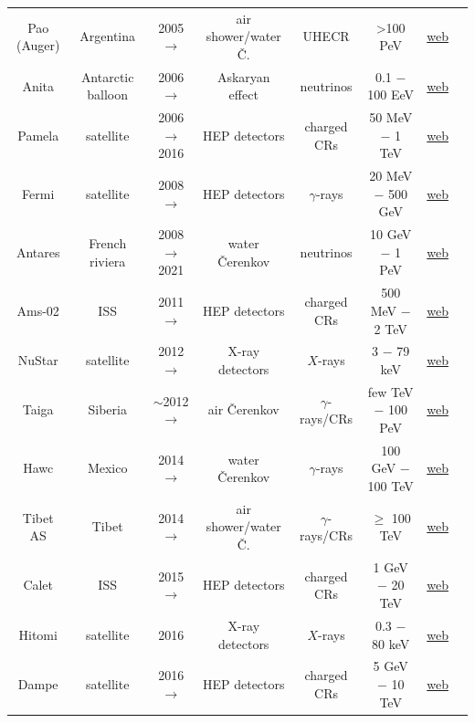 \begin{table}[p]
\begin{center}
{\begin{tabular}{cccccccc}
{\sc  Pao (Auger)} & Argentina & 2005 $\to$ & air shower/water \v C. &  UHECR & >100 PeV  & \href{https://www.auger.org/}{web} &\cite{Auger} \\
{\sc Anita} & Antarctic balloon & 2006 $\to$ & Askaryan effect & neutrinos & 0.1 $-$ 100 EeV &  \href{https://www.phys.hawaii.edu/~anita/}{web} & \cite{Anita} \\
{\sc Pamela} & satellite & 2006 $\to$ 2016 & HEP detectors & charged CRs & 50 MeV $-$ 1 TeV & \href{http://pamela.roma2.infn.it/index.php}{web}  & \cite{Pamela} \\
{\sc  Fermi} & satellite & 2008 $\to$ & HEP detectors  & $\gamma$-rays & 20 MeV $-$ 500 GeV & \href{http://fermi.gsfc.nasa.gov}{web} & \cite{Fermi} \\
{\sc  Antares} & French riviera & 2008 $\to$ 2021 & water \v Cerenkov & neutrinos & 10 GeV $-$ 1 PeV & \href{http://antares.in2p3.fr}{web}  & \cite{Antares} \\
{\sc Ams-02} & ISS & 2011 $\to$ & HEP detectors  & charged CRs & 500 MeV $-$ 2 TeV & \href{http://www.ams02.space}{web}  & \cite{Ams-02} \\
{\sc NuStar} & satellite & 2012 $\to$ & X-ray detectors  & $X$-rays & 3 $-$ 79 keV & \href{http://www.nustar.caltech.edu/page/researchers}{web}  & \cite{NuStar} \\
{\sc Taiga} & Siberia & $\sim$2012 $\to$ & air \v Cerenkov & $\gamma$-rays/CRs & few TeV $-$ 100 PeV & \href{https://taiga-experiment.info/}{web} & \cite{Taiga} \\
{\sc Hawc} & Mexico & 2014 $\to$ & water \v Cerenkov & $\gamma$-rays & 100 GeV $-$ 100 TeV & \href{http://www.hawc-observatory.org}{web} & \cite{Hawc} \\
{\sc Tibet AS} & Tibet & 2014 $\to$ & air shower/water \v C. & $\gamma$-rays/CRs & $\ge$ 100 TeV & \href{https://www.icrr.u-tokyo.ac.jp/em/index.html}{web} & \cite{TibetAS} \\
{\sc Calet} & ISS & 2015 $\to$ & HEP detectors  & charged CRs & 1 GeV $-$ 20 TeV & \href{http://calet.pi.infn.it}{web}  & \cite{Calet} \\
{\sc Hitomi} & satellite & 2016 & X-ray detectors & $X$-rays & 0.3 $-$ 80 keV & \href{http://global.jaxa.jp/projects/sat/astro_h/}{web} & \cite{Hitomi} \\
{\sc  Dampe} & satellite & 2016 $\to$ & HEP detectors & charged CRs & 5 GeV $-$ 10 TeV & \href{http://dpnc.unige.ch/dampe}{web}  & \cite{Dampe} \\

\end{tabular}}
\end{center}
\end{table}
